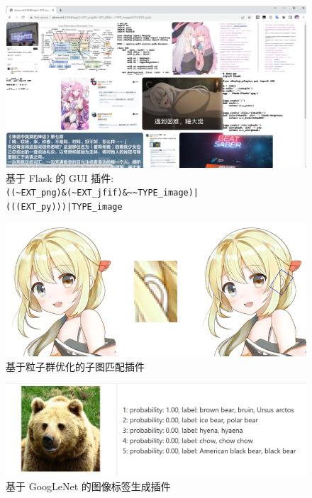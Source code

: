 \documentclass{beamer}
\begin{document}
\begin{frame}
    \begin{figure}[h]
        \centering
        \includegraphics[height=.6\textheight]{pic/flask2.png}
        \caption{基于 Flask 的 GUI 插件:\\ \tt{((\textasciitilde EXT\_png)\&(\textasciitilde EXT\_jfif)\&\textasciitilde\textasciitilde TYPE\_image)|(((EXT\_py)))|TYPE\_image}}
    \end{figure}
\end{frame}

\begin{frame}
    \begin{figure}[l]
        \centering
        \includegraphics[height=.5\textheight]{pic/pso.png}
        \caption{基于粒子群优化的子图匹配插件}
    \end{figure}
\end{frame}

\begin{frame}
    \begin{figure}[l]
        \centering
        \includegraphics[height=.4\textheight]{pic/ggnet.png}
        \caption{基于 GoogLeNet 的图像标签生成插件}
    \end{figure}
\end{frame}
\end{document}
